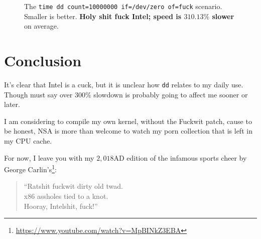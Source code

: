 \documentclass[12pt,a4paper,onecolumn, openright]{article}
\begin{document}
\begin{figure}[h]
\centering
\caption{The \texttt{time dd count=10000000 if=/dev/zero of=fuck} scenario.
Smaller is better. \textbf{Holy shit fuck Intel; speed is
\underline{$310.13\%$} slower} on average.}
\end{figure}

\section{Conclusion}
It's clear that Intel is a cuck, but it is unclear how \texttt{dd} relates to
my daily use. Though must say over $300\%$ slowdown is probably going to affect
me sooner or later.

I am considering to compile my own kernel, without the Fuckwit patch, cause to
be honest, NSA is more than welcome to watch my porn collection that is left in
my CPU cache.

For now, I leave you with my $2,018$AD edition of the infamous sports cheer by
George Carlin's\footnote{\url{https://www.youtube.com/watch?v=MpBINkZ3EBA}}:
\begin{quote}\centering
``Ratshit fuckwit dirty old twad.\\
x86 assholes tied to a knot.\\
Hooray, Intelshit, fuck!''
\end{quote}
\end{document}

